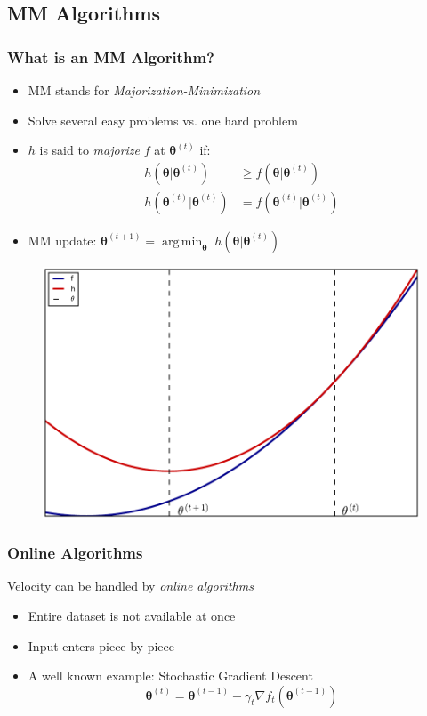 \documentclass{beamer}
\newcommand{\iter}[2]{#1^{(#2)}}
\DeclareMathOperator*{\argmin}{arg\,min}
\begin{document}
\subsection{MM Algorithms}
\begin{frame}
  \frametitle{What is an MM Algorithm?}
  \begin{itemize}
    \item MM stands for \emph{Majorization-Minimization}
    \item Solve several easy problems vs. one hard problem
    \item $h$ is said to \emph{majorize}  $f$ at $\iter{\bm\theta}{t}$ if:
    $$\begin{aligned}
      h(\bm\theta|\iter{\bm\theta}{t}) &\ge f(\bm\theta|\iter{\bm\theta}{t}) \\
      h(\iter{\bm\theta}{t}|\iter{\bm\theta}{t}) &= f(\iter{\bm\theta}{t}|\iter{\bm\theta}{t})
    \end{aligned}$$
    \item MM update: $\bm\theta^{(t+1)} = \argmin_{\bm\theta} \; h(\bm\theta|\bm\theta^{(t)})$
  \end{itemize}
\end{frame}
\begin{frame}
  \begin{figure}
    \includegraphics[width=\linewidth]{figures/mmvis.pdf}
  \end{figure}
\end{frame}
\begin{frame}
  \frametitle{Online Algorithms}
  Velocity can be handled by \emph{online algorithms}
  \begin{itemize}
    \item Entire dataset is not available at once
    \item Input enters piece by piece
    \item A well known example: Stochastic Gradient Descent
    $$\iter{\bm\theta}{t} = \iter{\bm\theta}{t-1} - \gamma_t \nabla f_t(\iter{\bm\theta}{t-1})$$
  \end{itemize}
\end{frame}
\end{document}

